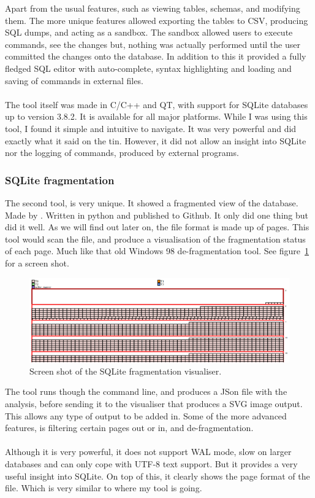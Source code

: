Apart from the usual features, such as viewing tables, schemas, and modifying them. The more unique features allowed exporting the tables to CSV, producing SQL dumps, and acting as a sandbox. The sandbox allowed users to execute commands, see the changes but, nothing was actually performed until the user committed the changes onto the database. In addition  to this it provided a fully fledged SQL editor with auto-complete, syntax highlighting and loading and saving of commands in external files.
\\\\
The tool itself was made in C/C++ and QT, with support for SQLite databases up to version 3.8.2. It is available for all major platforms. While I was using this tool, I found it simple and intuitive to navigate. It was very powerful and did exactly what it said on the tin. However, it did not allow an insight into SQLite nor the logging of commands, produced by external programs.

\subsubsection{SQLite fragmentation}
\label{subsubsec:sqlite_fragmentation}

The second tool, is very unique. It showed a fragmented view of the database. Made by \cite{sqlitefrag}. Written in python and published to Github. It only did one thing but did it well. As we will find out later on, the file format is made up of pages. This tool would scan the file, and produce a visualisation of the fragmentation status of each page. Much like that old Windows 98 de-fragmentation tool. See figure~\ref{fig:db_visualizer} for a screen shot.

\begin{figure}[H]
	\centering
	\includegraphics[scale=0.85]{images/db_visualizer.png}
	\caption{Screen shot of the SQLite fragmentation visualiser. \citep{sqlitefrag}}
	\label{fig:db_visualizer}
\end{figure}

The tool runs though the command line, and produces a JSon file with the analysis, before sending it to the visualiser that produces a SVG image output. This allows any type of output to be added in. Some of the more advanced features, is filtering certain pages out or in, and de-fragmentation. 
\\\\
Although it is very powerful, it does not support WAL mode, slow on larger databases and can only cope with UTF-8 text support. But it provides a very useful insight into SQLite. On top of this, it clearly shows the page format of the file. Which is very similar to where my tool is going.

